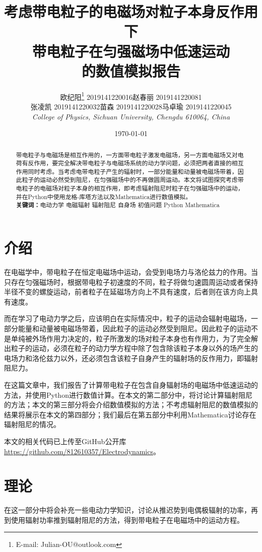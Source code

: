 \documentclass{article} %
\title{考虑带电粒子的电磁场对粒子本身反作用下\\带电粒子在匀强磁场中低速运动\\的数值模拟报告} %
\author{欧纪阳\footnote{E-mail: Julian-OU@outlook.com} 2019141220016\quad 赵春丽 2019141220081\\ 张凌凯 2019141220032\quad 苗森 2019141220028\quad 马卓瑜 2019141220045\\ \textit{College of Physics, Sichuan University, Chengdu 610064, China}} %
\date{\today} %
\begin{document}
\maketitle %
\begin{abstract}
  带电粒子与电磁场是相互作用的，一方面带电粒子激发电磁场，另一方面电磁场又对电荷有反作用，要完全解决带电粒子与电磁场系统的动力学问题，必须把两者直接的相互作用同时考虑。当考虑电带电粒子产生的辐射时，一部分能量和动量被电磁场带着，因此粒子的运动必然受到阻尼，在匀强磁场中的不再做圆周运动。本文将试图探究考虑带电粒子的电磁场对粒子本身的相互作用，即考虑辐射阻尼时粒子在匀强磁场中的运动，并在Python中使用龙格-库塔方法以及Mathematica进行数值模拟。\\
  \textbf{关键词：}电动力学 \quad 电磁辐射 \quad 辐射阻尼 \quad 自身场 \quad 初值问题 \quad Python \quad Mathematica
\end{abstract}

\section{介绍}
在电磁学中，带电粒子在恒定电磁场中运动，会受到电场力与洛伦兹力的作用。当只存在匀强磁场时，根据带电粒子初速度的不同，粒子将做匀速圆周运动或者保持半径不变的螺旋运动，前者粒子在延磁场方向上不具有速度，后者则在该方向上具有速度。

而在学习了电动力学之后，应该明白在实际情况中，粒子的运动会辐射电磁场，一部分能量和动量被电磁场带着，因此粒子的运动必然受到阻尼。因此粒子的运动不是单纯被外场作用力决定的，粒子所激发的场对粒子本身也有作用力，为了完全解出粒子的运动，必须在粒子的动力学方程中除了包含除该粒子本身以外的场产生的电场力和洛伦兹力以外，还必须包含该粒子自身产生的辐射场的反作用力，即辐射阻尼力。

在这篇文章中，我们报告了计算带电粒子在包含自身辐射场的电磁场中低速运动的方法，并使用Python进行数值计算。在本文的第二部分中，将讨论计算辐射阻尼的方法；本文的第三部分将会介绍数值模拟的方法；不考虑辐射阻尼的数值模拟的结果将展示在本文的第四部分；我们最后在第五部分中利用Mathematica讨论存在辐射阻尼的情况。

本文的相关代码已上传至GitHub公开库\url{https://github.com/812610357/Electrodynamics}。

\section{理论}
在这一部分中将会补充一些电动力学知识，讨论从推迟势到电偶极辐射的功率，再到使用辐射功率推到辐射阻尼的方法，得到带电粒子在电磁场中的运动方程。
\end{document}
